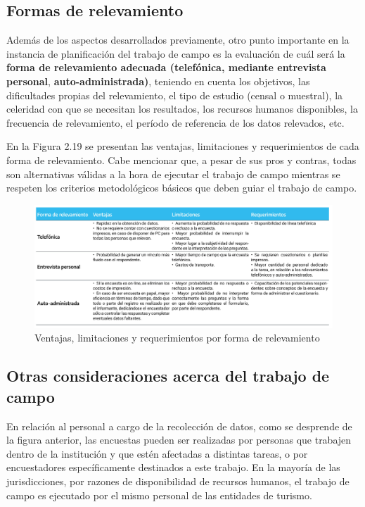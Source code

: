 \documentclass[
]{book}
\begin{document}
\hypertarget{formas-de-relevamiento}{%
\subsection{Formas de relevamiento}\label{formas-de-relevamiento}}

Además de los aspectos desarrollados previamente, otro punto importante en la instancia de planificación del trabajo de campo es la evaluación de cuál será la \textbf{forma de relevamiento adecuada (telefónica, mediante entrevista personal}, \textbf{auto-administrada)}, teniendo en cuenta los objetivos, las dificultades propias del relevamiento, el tipo de estudio (censal o muestral), la celeridad con que se necesitan los resultados, los recursos humanos disponibles, la frecuencia de relevamiento, el período de referencia de los datos relevados, etc.

En la Figura 2.19 se presentan las ventajas, limitaciones y requerimientos de cada forma de relevamiento. Cabe mencionar que, a pesar de sus pros y contras, todas son alternativas válidas a la hora de ejecutar el trabajo de campo mientras se respeten los criterios metodológicos básicos que deben guiar el trabajo de campo.

\begin{figure}

{\centering \includegraphics[width=0.8\linewidth]{imagenes/tabla_6} 

}

\caption{Ventajas, limitaciones y requerimientos por forma de relevamiento}\label{fig:relevamiento}
\end{figure}

\hypertarget{otras-consideraciones-acerca-del-trabajo-de-campo}{%
\subsection{Otras consideraciones acerca del trabajo de campo}\label{otras-consideraciones-acerca-del-trabajo-de-campo}}

En relación al personal a cargo de la recolección de datos, como se desprende de la figura anterior, las encuestas pueden ser realizadas por personas que trabajen dentro de la institución y que estén afectadas a distintas tareas, o por encuestadores específicamente destinados a este trabajo. En la mayoría de las jurisdicciones, por razones de disponibilidad de recursos humanos, el trabajo de campo es ejecutado por el mismo personal de las entidades de turismo.
\end{document}
